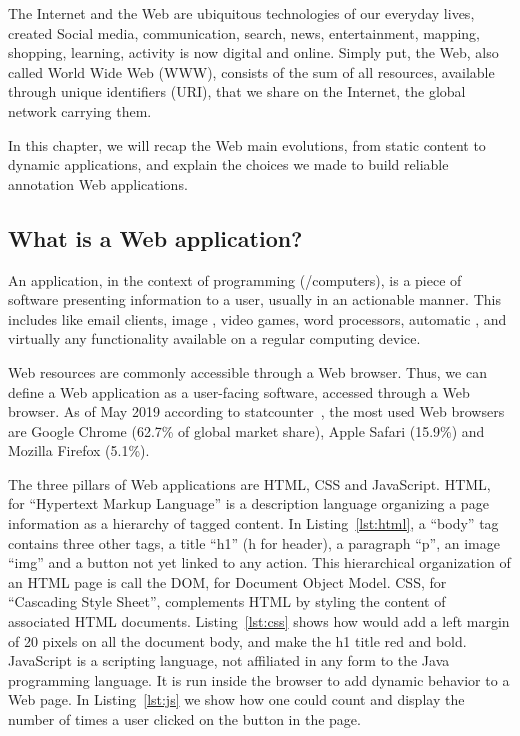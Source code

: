 The Internet and the Web are ubiquitous technologies of our everyday lives,
created 
Social media, communication, search, news, entertainment, mapping,
shopping, learning,  activity is now digital and online.
Simply put, the Web, also called World Wide Web (WWW), consists of the sum of all resources,
available through unique identifiers (URI), that we share on the Internet,
the global network carrying them.

In this chapter, we will recap the Web main evolutions,
from static content to dynamic applications,
and explain the choices we made to build reliable annotation Web applications.

\subsection{What is a Web application?}%
\label{sub:web_application}

An application, in the context of programming (/computers),
is a piece of software presenting information to a user,
usually in an actionable manner.
This includes  like email clients, image , video games,
word processors, automatic , and virtually any functionality
available on a regular computing device.

Web resources are commonly accessible through a Web browser.
Thus, we can define a Web application as a user-facing software,
accessed through a Web browser.
As of May 2019 according to statcounter~\cite{browser-market-share},
the most used Web browsers are Google Chrome (62.7\% of global market share),
Apple Safari (15.9\%) and Mozilla Firefox (5.1\%).

The three pillars of Web applications are HTML, CSS and JavaScript.
HTML, for ``Hypertext Markup Language'' is a description language
organizing a page information as a hierarchy of tagged content.
In Listing~\ref{lst:html}, a ``body'' tag contains three other tags,
a title ``h1'' (h for header), a paragraph ``p'', an image ``img''
and a button not yet linked to any action.
This hierarchical organization of an HTML page is call the DOM,
for Document Object Model.
CSS, for ``Cascading Style Sheet'', complements HTML by styling
the content of associated HTML documents.
Listing~\ref{lst:css} shows how  would add a left margin of 20 pixels
on all the document body, and make the h1 title red and bold.
JavaScript is a scripting language, not affiliated in any form
to the Java programming language.
It is run inside the browser to add dynamic behavior to a Web page.
In Listing~\ref{lst:js} we show how one could count and display
the number of times a user clicked on the button in the page.

